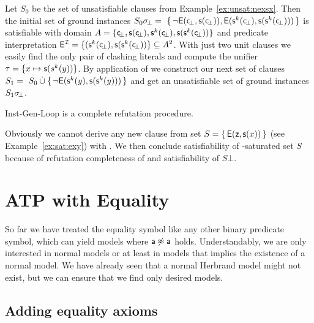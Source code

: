 \begin{example}\label{ex:unsat2}
Let \( S_0 \) be the set of unsatisfiable clauses
from Example~\ref{ex:unsat:nexsx}.
Then the initial set of ground instances
\( S_0\sigma \!_\bot =\
 \{ \,
{ \lnot\mathsf{E}(\mathsf{c} \!_\bot, \mathsf{s}(\mathsf{c} \!_\bot)) },
{ \mathsf{E}(\mathsf{s}^k(\mathsf{c} \!_\bot), \mathsf{s}(\mathsf{s}^k(\mathsf{c} \!_\bot)))}
 \, \} \)
is satisfiable with domain
\( A = \{ \mathsf{c} \!_\bot, \mathsf{s}(\mathsf{c} \!_\bot), \mathsf{s}^k(\mathsf{c} \!_\bot), \mathsf{s}(\mathsf{s}^k(\mathsf{c} \!_\bot)) \} \)
and predicate interpretation
\( \mathsf{E}^{\mathcal{I}} = \{ (\mathsf{s}^k(\mathsf{c} \!_\bot), \mathsf{s}(\mathsf{s}^k(\mathsf{c} \!_\bot)) \} \subseteq A^2 \).
%
 With just two unit clauses we easily find the only pair of clashing literals and compute the unifier
 \( \tau = \{ x\mapsto \mathsf{s}(s^k(y)) \} \).
 By application of \InstGen{} we construct our next set of clauses
\( S_1 =\
S_0 \mathbin{\dot\cup}
 \{ \,
 { \lnot\mathsf{E}(\mathsf{s}^k(y), \mathsf{s}(\mathsf{s}^k(y)))}
 \, \}
 \)
 and get an unsatisfiable set of ground instances \( S_1\sigma \!_\bot \).
\end{example}


\begin{lemma}
	Inst-Gen-Loop is a complete refutation procedure.
\end{lemma}

\begin{example}
	Obviously we cannot derive any new clause from set
	\( S = \{ \, \mathsf{E}(\mathsf{z},\mathsf{s}(x)) \, \} \)
	(see Example~\ref{ex:sat:exy}) with \InstGen.
	We then conclude satisfiability
	of \InstGen-saturated set \( S \)
	because of refutation completeness of \InstGen 
	and satisfiability of \( S\bot \).
\end{example}


\section{ATP with Equality}\label{sec:proving:with:equality}

So far we have treated the equality symbol like any other binary predicate symbol,
which can yield models where \( \mathsf{a}\not\approx\mathsf{a} \) holds.
Understandably, we are only interested in normal models or
at least in models that implies the existence of a normal model.
We have already seen that a normal Herbrand model might not exist,
but we can ensure that we find only desired models.

\subsection{Adding equality axioms}\label{sec:equality:axioms}


